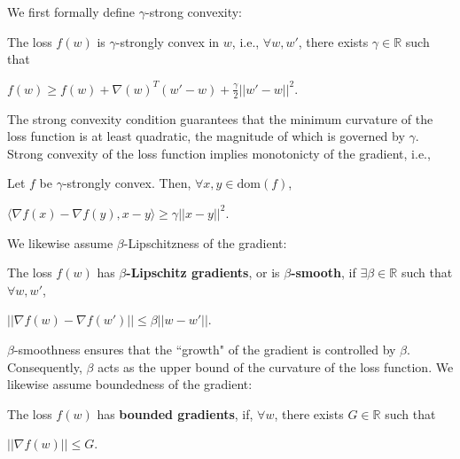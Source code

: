 \documentclass[twoside,11pt]{article}
\begin{document}
We first formally define $\gamma$-strong convexity:

\begin{definition}
The loss $f(w)$ is $\gamma$-strongly convex in $w$, i.e., $\forall w, w'$, there exists $\gamma \in \mathbb{R}$ such that

\begin{center}
$f(w) \geq f(w) + \nabla (w)^T (w' - w) + \frac{\gamma}{2}||w' - w||^2$.
\end{center}
\end{definition}

\noindent
The strong convexity condition guarantees that the minimum curvature of the loss function is at least quadratic, the magnitude of which is governed by $\gamma$. Strong convexity of the loss function implies monotonicty of the gradient, i.e.,

\begin{corollary}
Let $f$ be $\gamma$-strongly convex. Then, $\forall x,y \in \text{dom}(f)$,

\begin{center}
$\langle \nabla f(x) - \nabla f(y), x-y \rangle \geq \gamma || x-y ||^2$.
\end{center}
\end{corollary}

\noindent
We likewise assume $\beta$-Lipschitzness of the gradient:

\begin{definition}
The loss $f(w)$ has \textbf{$\beta$-Lipschitz gradients}, or is \textbf{$\beta$-smooth}, if $\exists \beta \in \mathbb{R}$ such that $\forall w, w'$,

\begin{center}
$||\nabla f(w) - \nabla f(w')|| \leq \beta ||w - w'||$.
\end{center}
\end{definition}

\noindent
$\beta$-smoothness ensures that the ``growth" of the gradient is controlled by $\beta$. Consequently, $\beta$ acts as the upper bound of the curvature of the loss function. We likewise assume boundedness of the gradient:

\begin{definition}
The loss $f(w)$ has \textbf{bounded gradients}, if, $\forall w$, there exists $G \in \mathbb{R}$ such that

\begin{center}
$||\nabla f(w)|| \leq G$.
\end{center}
\end{definition}
\end{document}
